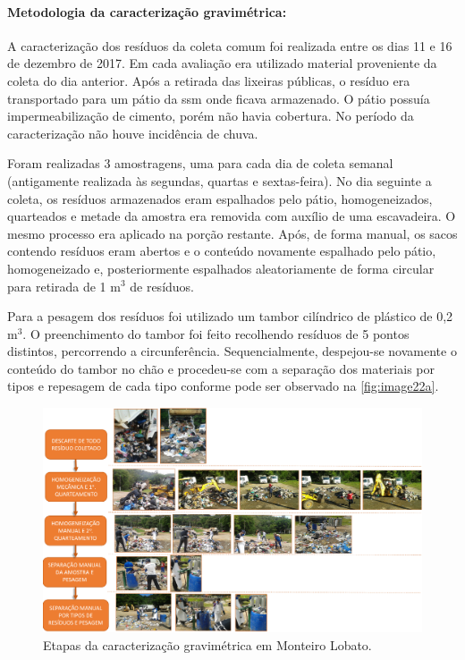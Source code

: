 	\paragraph{\textbf{Metodologia da caracterização gravimétrica:}}
	
	A caracterização dos resíduos da coleta comum foi realizada entre os dias 11 e 16 de dezembro de 2017. Em cada avaliação era utilizado material proveniente da coleta do dia anterior. Após a retirada das lixeiras públicas, o resíduo era transportado para um pátio da \gls{ssm} onde ficava armazenado. O pátio possuía impermeabilização de cimento, porém não havia cobertura. No período da caracterização não houve incidência de chuva.
	
	Foram realizadas 3 amostragens, uma para cada dia de coleta semanal (antigamente realizada às segundas, quartas e sextas-feira). No dia seguinte a coleta, os resíduos armazenados eram espalhados pelo pátio, homogeneizados, quarteados e metade da amostra era removida com auxílio de uma escavadeira. O mesmo processo era aplicado na porção restante. Após, de forma manual, os sacos contendo resíduos eram abertos e o conteúdo novamente espalhado pelo pátio, homogeneizado e, posteriormente espalhados aleatoriamente de forma circular para retirada de 1 m$^{3}$ de resíduos.
	
	Para a pesagem dos resíduos foi utilizado um tambor cilíndrico de plástico de 0,2 m$^{3}$. O preenchimento do tambor foi feito recolhendo resíduos de 5 pontos distintos, percorrendo a circunferência. Sequencialmente, despejou-se novamente o conteúdo do tambor no chão e procedeu-se com a separação dos materiais por tipos e repesagem de cada tipo conforme pode ser observado na \autoref{fig:image22a}.
	
	\begin{figure}
		\centering
		\includegraphics[width=0.7\linewidth]{produtos/prodtres/image22a}
		\caption{Etapas da caracterização gravimétrica em Monteiro Lobato.}
		\label{fig:image22a}
	\end{figure}

